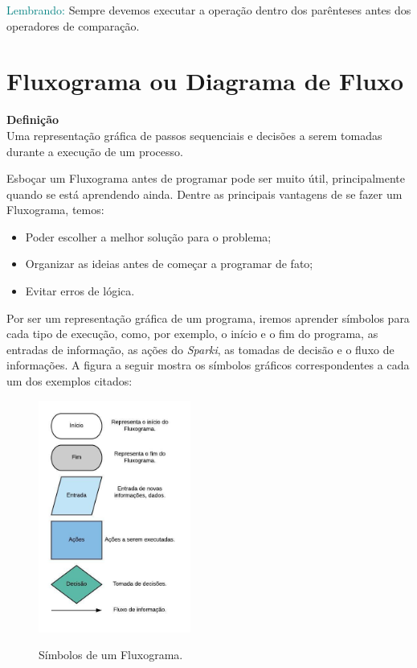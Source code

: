     \begin{center}
    \textcolor{teal}{Lembrando:}
    Sempre devemos executar a operação dentro dos parênteses antes dos operadores de comparação.
    \end{center}

\section{Fluxograma ou Diagrama de Fluxo}

    \begin{center}
    \textbf{Definição} 
    \\
    Uma representação gráfica de passos sequenciais e decisões a serem tomadas durante a execução de um processo.
    \end{center}
    
    Esboçar um Fluxograma antes de programar pode ser muito útil, principalmente quando se está aprendendo ainda. Dentre as principais vantagens de se fazer um Fluxograma, temos:
    \begin{itemize}
        \item Poder escolher a melhor solução para o problema;
        \item Organizar as ideias antes de começar a programar de fato;
        \item Evitar erros de lógica.
    \end{itemize}

    Por ser um representação gráfica de um programa, iremos aprender símbolos para cada tipo de execução, como, por exemplo, o início e o fim do programa, as entradas de informação, as ações do \textsl{Sparki}, as tomadas de decisão e o fluxo de informações. A figura a seguir mostra os símbolos gráficos correspondentes a cada um dos exemplos citados:
    
    \begin{figure}[h]
    \caption{Símbolos de um Fluxograma.}
     
    \centering 
    \includegraphics[width=5cm]{Figuras/Diagrama em branco.jpeg}
    \label{figura:Diagrama em branco.jpeg}
    \end{figure}
 
